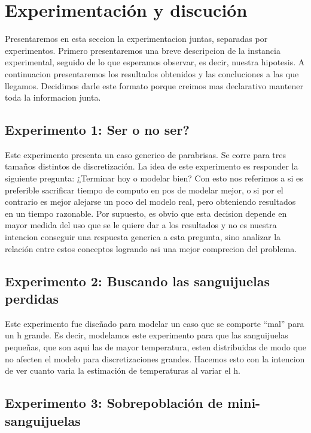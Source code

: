 \section{Experimentaci\'on y discuci\'on}

Presentaremos en esta seccion la experimentacion juntas, separadas por experimentos. Primero presentaremos una breve descripcion de la instancia 
experimental, seguido de lo que esperamos observar, es decir, nuestra hipotesis. A continuacion presentaremos los resultados obtenidos y las
concluciones a las que llegamos. Decidimos darle este formato porque creimos mas declarativo mantener toda la informacion junta. 

\subsection{Experimento 1: Ser o no ser?}

Este experimento presenta un caso generico de parabrisas. Se corre para tres tama\~nos distintos de discretizaci\'on. La idea de este experimento
es responder la siguiente pregunta: ¿Terminar hoy o modelar bien? Con esto nos referimos a si es preferible sacrificar tiempo de computo en 
pos de modelar mejor, o si por el contrario es mejor alejarse un poco del modelo real, pero obteniendo resultados en un tiempo razonable. Por 
supuesto, es obvio que esta decision depende en mayor medida del uso que se le quiere dar a los resultados y no es nuestra intencion conseguir 
una respuesta generica a esta pregunta, sino analizar la relaci\'on entre estos conceptos logrando asi una mejor comprecion del problema.

\subsection{Experimento 2: Buscando las sanguijuelas perdidas}

Este experimento fue dise\~nado para modelar un caso que se comporte ``mal'' para un h grande. Es decir, modelamos este experimento para que 
las sanguijuelas peque\~nas, que son aqui las de mayor temperatura, esten distribuidas de modo que no afecten el modelo para discretizaciones grandes. 
Hacemos esto con la intencion de ver cuanto varia la estimaci\'on de temperaturas al variar el h.

\subsection{Experimento 3: Sobrepoblaci\'on de mini-sanguijuelas}

